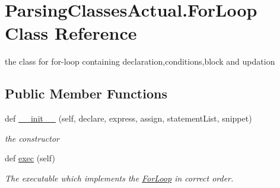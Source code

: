 \hypertarget{class_parsing_classes_actual_1_1_for_loop}{}\section{Parsing\+Classes\+Actual.\+For\+Loop Class Reference}
\label{class_parsing_classes_actual_1_1_for_loop}


the class for for-\/loop containing declaration,conditions,block and updation  


\subsection*{Public Member Functions}
\begin{DoxyCompactItemize}
\item 
def \hyperlink{class_parsing_classes_actual_1_1_for_loop_a1a97fc2d259b140ef8db3d3d455a286f}{\+\_\+\+\_\+init\+\_\+\+\_\+} (self, declare, express, assign, statement\+List, snippet)
\begin{DoxyCompactList}\small\item\em the constructor \end{DoxyCompactList}\item 
\mbox{\label{class_parsing_classes_actual_1_1_for_loop_a817cdfbfca1b14eb973d203863292940}} 
def \hyperlink{class_parsing_classes_actual_1_1_for_loop_a817cdfbfca1b14eb973d203863292940}{exec} (self)
\begin{DoxyCompactList}\small\item\em The executable which implements the \hyperlink{class_parsing_classes_actual_1_1_for_loop}{For\+Loop} in correct order. \end{DoxyCompactList}\end{DoxyCompactItemize}
